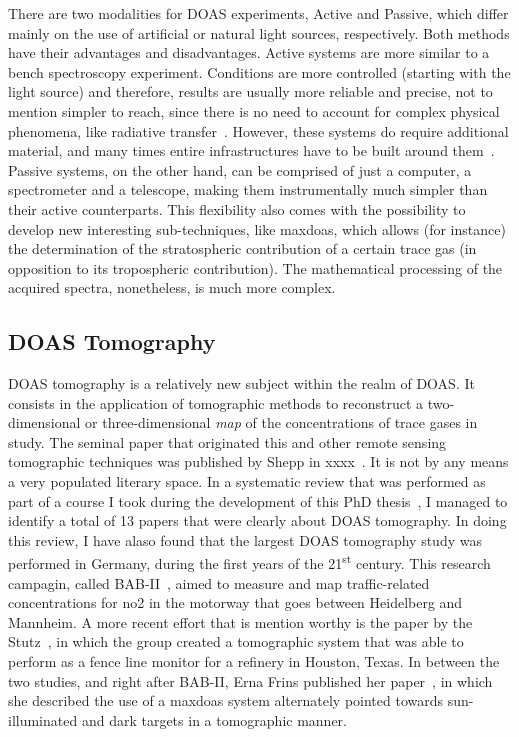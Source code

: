 There are two modalities for \gls{DOAS} experiments, Active and Passive,
which differ mainly on the use of artificial or natural light sources,
respectively. Both methods have their advantages and disadvantages.
Active systems are more similar to a bench spectroscopy experiment.
Conditions are more controlled (starting with the light source) and
therefore, results are usually more reliable and precise, not to mention
simpler to reach, since there is no need to account for complex physical
phenomena, like radiative transfer~\cite{Platt2007}. However, these
systems do require additional material, and many times entire
infrastructures have to be built around them~\cite{Pundt2005}. Passive
systems, on the other hand, can be comprised of just a computer, a
spectrometer and a telescope, making them instrumentally much simpler
than their active counterparts. This flexibility also comes with the
possibility to develop new interesting sub-techniques, like
\gls{maxdoas}, which allows (for instance) the determination of the
stratospheric contribution of a certain trace gas (in opposition to its
tropospheric contribution). The mathematical processing of the acquired
spectra, nonetheless, is much more complex.

\subsection{DOAS Tomography}%
\label{sub:doas_tomography}

DOAS tomography is a relatively new subject within the realm of
\gls{DOAS}. It consists in the application of tomographic methods to
reconstruct a two-dimensional or three-dimensional \emph{map} of the
concentrations of trace gases in study. The seminal paper that
originated this and other remote sensing tomographic techniques was
published by Shepp in xxxx~. It is not by any means a very populated
literary space. In a systematic review that was performed as part of a
course I took during the development of this PhD thesis~, I managed
to identify a total of 13 papers that were clearly about DOAS
tomography. In doing this review, I have alaso found that the largest
DOAS tomography study was performed in Germany, during the first years
of the 21\textsuperscript{st} century. This research campagin, called
BAB-II~\cite{Laepple2004}, aimed to measure and map traffic-related
concentrations for \gls{no2} in the motorway that goes between
Heidelberg and Mannheim. A more recent effort that is mention worthy is
the paper by the Stutz~\cite{Stutz2016}, in which the group created a
tomographic system that was able to perform as a fence  line monitor for
a refinery in Houston, Texas. In between the two studies, and right
after BAB-II, Erna Frins published her paper~\cite{Frins2006}, in which
she described the use of a \gls{maxdoas} system alternately pointed
towards sun-illuminated and dark targets in a tomographic manner.

